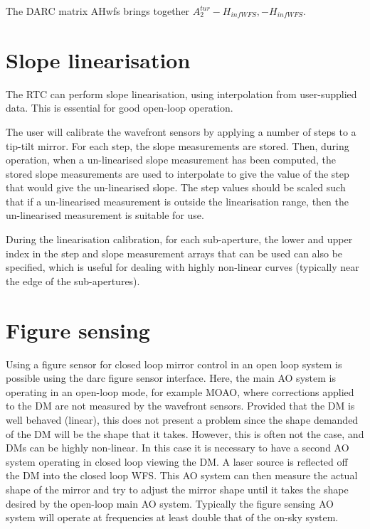 \documentclass[a4,10pt]{article}
\begin{document}
The DARC matrix AHwfs brings together $A_2^{tur}-H_{infWFS}, -H_{infWFS}$.



\section{Slope linearisation}
\label{sect:linearisation}
The RTC can perform slope linearisation, using interpolation from
user-supplied data.  This is essential for good open-loop operation.

The user will calibrate the wavefront sensors by applying a number of
steps to a tip-tilt mirror.  For each step, the slope measurements are
stored.  Then, during operation, when a un-linearised slope
measurement has been computed, the stored slope measurements are used
to interpolate to give the value of the step that would give the
un-linearised slope.  The step values should be scaled such that if a
un-linearised measurement is outside the linearisation range, then the
un-linearised measurement is suitable for use.

During the linearisation calibration, for each sub-aperture, the lower
and upper index in the step and slope measurement arrays that can be
used can also be specified, which is useful for dealing with highly
non-linear curves (typically near the edge of the sub-apertures).  

\section{Figure sensing}
Using a figure sensor for closed loop mirror control in an open loop
system is possible using the darc figure sensor interface.  Here, the
main AO system is operating in an open-loop mode, for example MOAO,
where corrections applied to the DM are not measured by the wavefront
sensors.  Provided that the DM is well behaved (linear), this does not
present a problem since the shape demanded of the DM will be the shape
that it takes.  However, this is often not the case, and DMs can be
highly non-linear.  In this case it is necessary to have a second AO
system operating in closed loop viewing the DM.  A laser source is
reflected off the DM into the closed loop WFS.  This AO system can
then measure the actual shape of the mirror and try to adjust the
mirror shape until it takes the shape desired by the open-loop main AO
system.  Typically the figure sensing AO system will operate at
frequencies at least double that of the on-sky system.  
\end{document}

